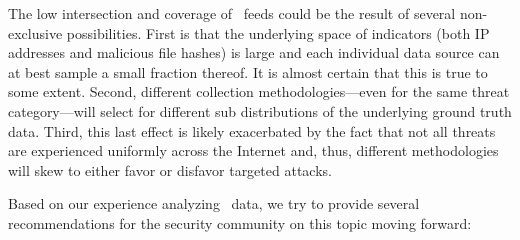 The low intersection and coverage of \ti\ feeds could be the result of
several non-exclusive possibilities.
First is that the underlying space of indicators (both IP addresses
and malicious file hashes) is large and each individual data source
can at best sample a small fraction thereof.  It is almost certain
that this is true to some extent.  Second, different collection
methodologies---even for the same threat category---will select for
different sub distributions of the underlying ground truth data.
Third, this last effect is likely exacerbated by the fact that not all
threats are experienced uniformly across the Internet and, thus,
different methodologies will skew to either favor or disfavor targeted
attacks.


\begin{comment}
While resolving this question is of academic interest, it seems clear
that blindly using \ti\ data---even if one could afford to acquire
many such sources---is unlikely to be effective.  Proactive defenses,
such as blocking network connections or file executions that match
\ti\ indicators, are predicated on knowing, in advance, a large
fraction of the universe of future indicators; the evidence is that
this is not currently possible.  While there may be some utility in
doing this even for the small percentage of malicious traffic that may
be identified, this must be balanced against the costs of obtaining
and managing \ti\ data as well as the risks associated with false
positives.
\end{comment}


Based on our experience analyzing \ti\ data, we try to provide several
recommendations for the security community on this topic moving forward:

